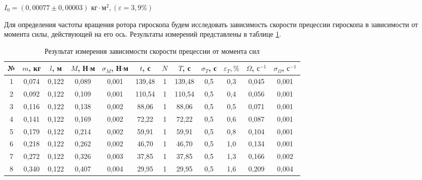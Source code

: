 \documentclass[a4paper, 12pt]{article}
\begin{document}
\begin{center}
\bigskip

\underline{$ I_0 = \left( 0,00077 \pm 0,00003 \right) \text{ кг} \cdot \text{м}^2, \left( \varepsilon = 3,9   \% \right) $}

\bigskip \bigskip

Для определения частоты вращения ротора гироскопа будем исследовать зависимость скорости прецессии гироскопа в зависимости от момента силы, действующей на его ось. Результаты измерений представлены в таблице \ref{sk_pre}.

    \begin{table}[H]
    	\centering
    	\begin{tabular}{|c|c|c|c|c|c|c|c|c|c|c|c|}
                \hline
		№  & $ m $, кг          & $ l $, м            & $ M $, Н$\cdot$м      & $ \sigma_M $, Н$\cdot$м             & $ t $, с & $ N$ & $ T $, с  & $ \sigma_T $, с          &  $ \varepsilon_T, \%$   & $ \Omega $, $ \text{с}^{-1} $ & $ \sigma_\Omega $, $ \text{с}^{-1} $ \\ \hline
  
        1 & 0,074 & 0,122 &  0,089 & 0,001  & 139,48 & 1 & 139,48 & 0,5 & 0,3 & 0,045 & 0,001 \\ \hline

        2 & 0,092 & 0,122 &  0,109 & 0,001  & 110,54 & 1 & 110,54 & 0,5 & 0,4 & 0,056 & 0,001 \\ \hline

        3 & 0,116 & 0,122 &  0,138 & 0,002  & 88,06  & 1 & 88,06 & 0,5 & 0,5 & 0,071 & 0,001 \\ \hline

        4 & 0,141 & 0,122 &  0,169 & 0,002  & 72,22  & 1 & 72,22 & 0,5 & 0,6 & 0,087 & 0,001 \\ \hline

        5 & 0,179 & 0,122 &  0,214 & 0,002  & 59,91  & 1 & 59,91 & 0,5 & 0,8 & 0,104 & 0,001 \\ \hline

        6 & 0,218 & 0,122 &  0,262 & 0,002  & 46,70  & 1 & 46,70 & 0,5 & 1,0 & 0,134 & 0,001 \\ \hline

        7 & 0,272 & 0,122 &  0,326 & 0,003  & 37,85  & 1 & 37,85 & 0,5 & 1,3 & 0,166 & 0,002 \\ \hline

        8 & 0,340 & 0,122 &  0,407 & 0,004  & 29,95  & 1 & 29,95 & 0,5 & 1,6 & 0,209 & 0,004 \\ \hline
    	\end{tabular}
    	\caption{Результат измерения зависимости скорости прецессии от момента сил}
    	\label{sk_pre}
    \end{table}


\end{center}
\end{document}
